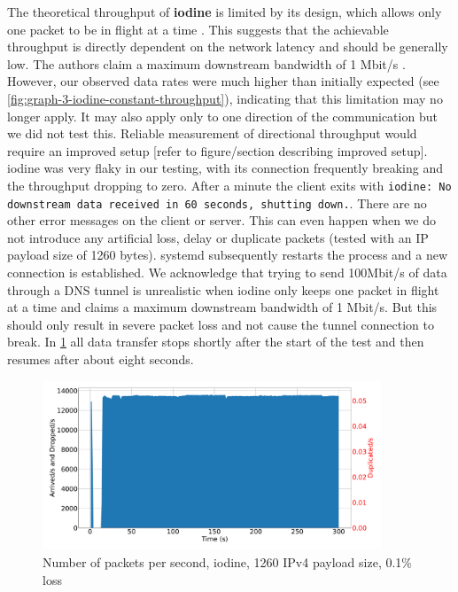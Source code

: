 The theoretical throughput of \textbf{iodine} is limited by its design, which allows only one packet to be in flight at a time \cite{iodine-README}.
This suggests that the achievable throughput is directly dependent on the network latency and should be generally low.
The authors claim a maximum downstream bandwidth of 1 Mbit/s \cite{iodine-homepage}.
However, our observed data rates were much higher than initially expected (see \cref{fig:graph-3-iodine-constant-throughput}), indicating that this limitation may no longer apply.
It may also apply only to one direction of the communication but we did not test this.
Reliable measurement of directional throughput would require an improved setup [refer to figure/section describing improved setup].
iodine was very flaky in our testing, with its connection frequently breaking and the throughput dropping to zero.
After a minute the client exits with \texttt{iodine: No downstream data received in 60 seconds, shutting down.}.
There are no other error messages on the client or server.
This can even happen when we do not introduce any artificial loss, delay or duplicate packets (tested with an IP payload size of 1260 bytes).
systemd subsequently restarts the process and a new connection is established.
We acknowledge that trying to send 100Mbit/s of data through a DNS tunnel is unrealistic when iodine only keeps one packet in flight at a time and claims a maximum downstream bandwidth of 1 Mbit/s.
But this should only result in severe packet loss and not cause the tunnel connection to break.
In \cref{fig:graph-2-iodine-dropout-packets} all data transfer stops shortly after the start of the test and then resumes after about eight seconds.
\begin{figure}[tbh]
	\centering
	\includegraphics[draft=false,width=0.9\textwidth]{figures/Graphs/graph-2-iodine-dropout/packet_counts_all.pdf}
	\caption{Number of packets per second, iodine, 1260 IPv4 payload size, 0.1\% loss}
	\label{fig:graph-2-iodine-dropout-packets}
\end{figure}

